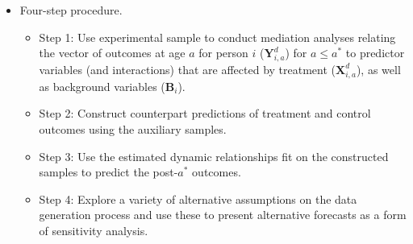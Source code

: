 \documentclass[static]{JJH-Beamer}
\begin{document}
\begin{frame}

\begin{itemize}
\item Four-step procedure.
    \begin{itemize}
    \item Step 1: Use experimental sample to conduct mediation analyses relating the vector of outcomes at age $a$ for person $i$ ($\bm{Y}^{d}_{i,a}$) for $a\leq a^*$ to predictor variables (and interactions) that are affected by treatment ($\bm{X}^{d}_{i,a}$), as well as background variables ($\bm{B}_i$).
    \item Step 2: Construct counterpart predictions of treatment and control outcomes using the auxiliary samples.
    \item Step 3: Use the estimated dynamic relationships fit on the constructed samples to predict the post-$a^{\ast}$ outcomes.
    \item Step 4: Explore a variety of alternative assumptions on the data generation process and use these to present alternative forecasts as a form of sensitivity analysis.
    \end{itemize}
\end{itemize}

\end{frame}
\clearpage
\end{document}
